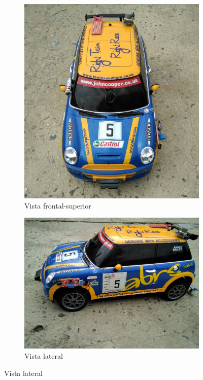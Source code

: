 \begin{figure}[H]
    \centering
    
    \begin{subfigure}[a]{0.7\textwidth}
        \begin{center}
        \includegraphics[height=0.5\textwidth]{imagenes/robot/frontal.jpg}
        \end{center}
        \caption{Vista frontal-superior}
        \label{fig:gull}
    \end{subfigure}
    
    \begin{subfigure}[b]{0.7\textwidth}
	\begin{center}
        \includegraphics[height=0.5\textwidth]{imagenes/robot/lateral.jpg}
        \end{center}
        \caption{Vista lateral}
        \label{fig:tiger}
    \end{subfigure}
    

\end{figure}
